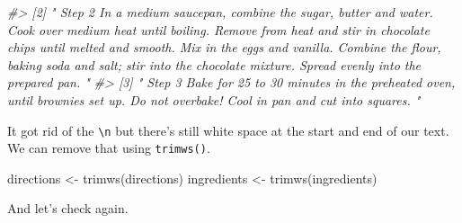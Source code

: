 \documentclass[
  12pt,
]{book}
\newenvironment{Shaded}{\begin{snugshade}}{\end{snugshade}}
\newcommand{\CommentTok}[1]{\textcolor[rgb]{0.37,0.37,0.37}{\textit{#1}}}
\newcommand{\FunctionTok}[1]{\textcolor[rgb]{0,0,0}{#1}}
\newcommand{\NormalTok}[1]{#1}
\newcommand{\OtherTok}[1]{\textcolor[rgb]{0.37,0.37,0.37}{#1}}
\begin{document}
\begin{Shaded}
\begin{Highlighting}[]
\CommentTok{\#\textgreater{} [2] "                                                                                                                                                            Step 2                                                                                                                                                                                                                                          In a medium saucepan, combine the sugar, butter and water. Cook over medium heat until boiling. Remove from heat and stir in chocolate chips until melted and smooth. Mix in the eggs and vanilla. Combine the flour, baking soda and salt; stir into the chocolate mixture. Spread evenly into the prepared pan.                                                                                                                                                        "}
\CommentTok{\#\textgreater{} [3] "                                                                                                                                                            Step 3                                                                                                                                                                                                                                          Bake for 25 to 30 minutes in the preheated oven, until brownies set up. Do not overbake! Cool in pan and cut into squares.                                                                                                                                                        "}
\end{Highlighting}
\end{Shaded}

It got rid of the \texttt{\textbackslash{}n} but there's still white space at the start and end of our text. We can remove that using \texttt{trimws()}.

\begin{Shaded}
\begin{Highlighting}[]
\NormalTok{directions }\OtherTok{\textless{}{-}} \FunctionTok{trimws}\NormalTok{(directions)}
\NormalTok{ingredients }\OtherTok{\textless{}{-}} \FunctionTok{trimws}\NormalTok{(ingredients)}
\end{Highlighting}
\end{Shaded}

And let's check again.
\end{document}

